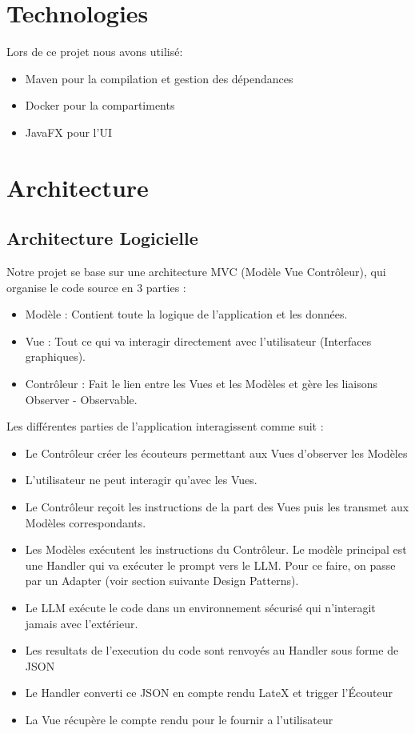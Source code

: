 \documentclass[11pt,a4paper]{article}
\begin{document}
\section{Technologies}
Lors de ce projet nous avons utilisé:
\begin{itemize}
    \item Maven pour la compilation et gestion des dépendances
    \item Docker pour la compartiments
    \item JavaFX pour l’UI
\end{itemize}

\section{Architecture}
\subsection{Architecture Logicielle}
Notre projet se base sur une architecture MVC (Modèle Vue Contrôleur), qui organise le code source en 3 parties :

\begin{itemize}
    \item Modèle : Contient toute la logique de l’application et les données.
    \item Vue : Tout ce qui va interagir directement avec l’utilisateur (Interfaces graphiques).
    \item Contrôleur : Fait le lien entre les Vues et les Modèles et gère les liaisons Observer - Observable.
\end{itemize}

Les différentes parties de l’application interagissent comme suit :

\begin{itemize}
    \item Le Contrôleur créer les écouteurs permettant aux Vues d’observer les Modèles
    \item L’utilisateur ne peut interagir qu'avec les Vues.
    \item Le Contrôleur reçoit les instructions de la part des Vues puis les transmet aux Modèles correspondants.
    \item Les Modèles exécutent les instructions du Contrôleur. Le modèle principal est une Handler qui va exécuter le prompt vers le LLM. Pour ce faire, on passe par un Adapter (voir section suivante Design Patterns).
    \item Le LLM exécute le code dans un environnement sécurisé qui n’interagit jamais avec l'extérieur.
    \item Les resultats de l’execution du code sont renvoyés au Handler sous forme de JSON
    \item Le Handler converti ce JSON en compte rendu LateX et trigger l'Écouteur
    \item La Vue récupère le compte rendu pour le fournir a l’utilisateur
\end{itemize}
\end{document}
